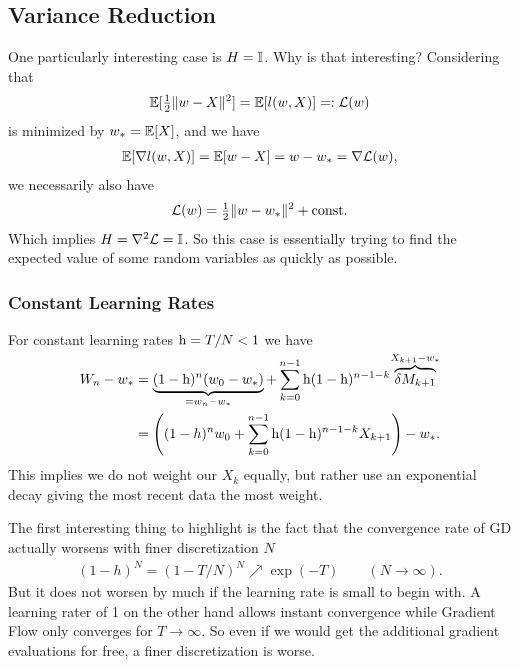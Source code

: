 \subsection{Variance Reduction}\label{subsec: variance reduction}

One particularly interesting case is \(H=\mathbb{I}\). Why is that interesting?
Considering that
\begin{align*}
	\mathbb{E}[\tfrac12\|w-X\|^2]=\mathbb{E}[l(w,X)]=:\mathcal{L}(w)
\end{align*}
is minimized by \(w_*=\mathbb{E}[X]\), and we have
\begin{align*}
	\mathbb{E}[\nabla l(w,X)]
	=\mathbb{E}[w-X]=w- w_*=\nabla\mathcal{L}(w),
\end{align*}
we necessarily also have
\begin{align*}
	\mathcal{L}(w) = \tfrac12\|w-w_*\|^2 + \text{const}.
\end{align*}
Which implies \(H=\nabla^2\mathcal{L}=\mathbb{I}\). So this case is essentially
trying to find the expected value of some random variables as quickly as
possible.

\subsubsection{Constant Learning Rates}

For constant learning rates \(\text{h}=T/N<1\) we have
\begin{align*}
	W_n - w_*
	&= \underbrace{(1-\text{h})^n(w_0 -w_*)}_{=w_n-w_*}
	+ \sum_{k=0}^{n-1}\text{h}(1-\text{h})^{n-1-k}
	\smash{\overbrace{\delta M_{k+1}}^{X_{k+1}-w_*}}\\
	&= \left((1-h)^nw_0 + \sum_{k=0}^{n-1}\text{h}(1-\text{h})^{n-1-k}X_{k+1}\right)-w_*.
\end{align*}
This implies we do not weight our \(X_k\) equally, but rather use an
exponential decay giving the most recent data the most weight.

The first interesting thing to highlight is the fact that the convergence
rate of GD actually worsens with finer discretization \(N\)
\begin{align*}
	(1-h)^N = (1-T/N)^N \nearrow \exp(-T) \qquad (N\to\infty).
\end{align*}
But it does not worsen by much if the learning rate is small to begin with. A
learning rater of 1 on the other hand allows instant convergence while Gradient
Flow only converges for \(T\to\infty\). So even if we would get the additional
gradient evaluations for free, a finer discretization is worse. 

